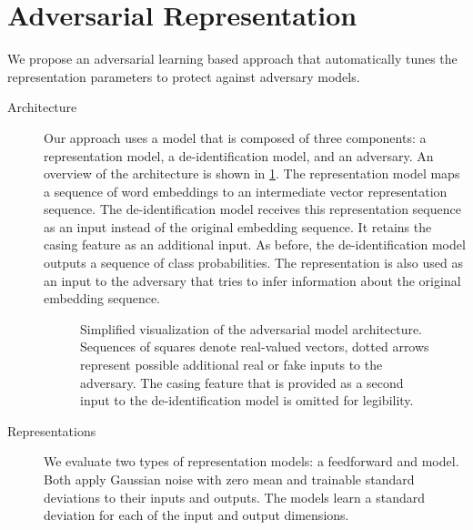 
\section{Adversarial Representation}\label{sec:adversarial-representation}
%
We propose an adversarial learning based approach that automatically tunes the representation parameters to protect against adversary models.

\begin{description}
    \item[Architecture]
    Our approach uses a model that is composed of three components: a representation model, a de-identification model, and an adversary.
    An overview of the architecture is shown in \cref{fig:adversarial-model}.
    The representation model maps a sequence of word embeddings to an intermediate vector representation sequence.
    The de-identification model receives this representation sequence as an input instead of the original embedding sequence.
    It retains the casing feature as an additional input.
    As before, the de-identification model outputs a sequence of class probabilities.
    The representation is also used as an input to the adversary that tries to infer information about the original embedding sequence.
    
    \begin{figure}
        \centering
        
        \caption[Adversarial model architecture]{%
            Simplified visualization of the adversarial model architecture.
            Sequences of squares denote real-valued vectors, dotted arrows represent possible additional real or fake inputs to the adversary.
            The casing feature that is provided as a second input to the de-identification model is omitted for legibility.}\label{fig:adversarial-model}
    \end{figure}
    
    \item[Representations]
    We evaluate two types of representation models: a feedforward and  model.
    Both apply Gaussian noise with zero mean and trainable standard deviations to their inputs and outputs.
    The models learn a standard deviation for each of the input and output dimensions.
    
    

\end{description}
